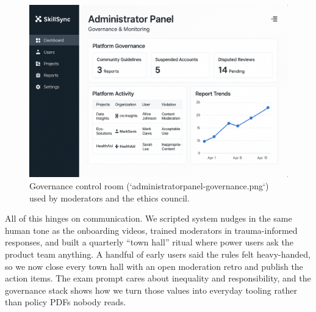 \begin{figure}[h]
  \centering
  \includegraphics[width=0.85\linewidth]{figures/opgave05/administratorpanel-governance.png}
  \caption{Governance control room (`administratorpanel-governance.png`) used by moderators and the ethics council.}
  \label{fig:admin-panel}
\end{figure}

All of this hinges on communication. We scripted system nudges in the same human tone as the onboarding videos, trained moderators in trauma-informed responses, and built a quarterly ``town hall'' ritual where power users ask the product team anything. A handful of early users said the rules felt heavy-handed, so we now close every town hall with an open moderation retro and publish the action items. The exam prompt cares about inequality and responsibility, and the governance stack shows how we turn those values into everyday tooling rather than policy PDFs nobody reads.
